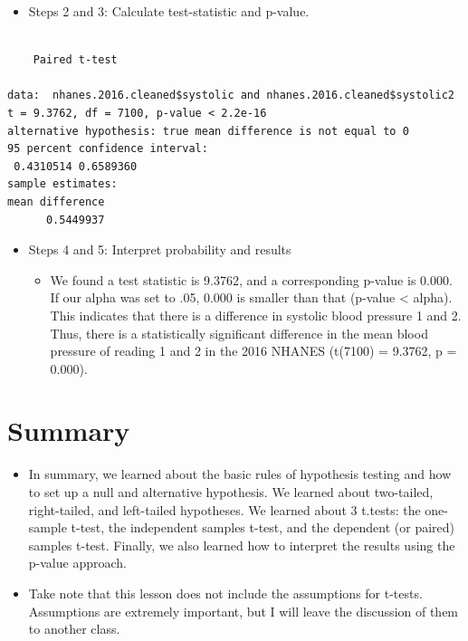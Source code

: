 \documentclass[
  letterpaper,
  DIV=11,
  numbers=noendperiod]{scrreprt}
\newenvironment{Shaded}{\begin{snugshade}}{\end{snugshade}}
\newcommand{\AttributeTok}[1]{\textcolor[rgb]{0.40,0.45,0.13}{#1}}
\newcommand{\ConstantTok}[1]{\textcolor[rgb]{0.56,0.35,0.01}{#1}}
\newcommand{\FloatTok}[1]{\textcolor[rgb]{0.68,0.00,0.00}{#1}}
\newcommand{\FunctionTok}[1]{\textcolor[rgb]{0.28,0.35,0.67}{#1}}
\newcommand{\NormalTok}[1]{\textcolor[rgb]{0.00,0.23,0.31}{#1}}
\newcommand{\SpecialCharTok}[1]{\textcolor[rgb]{0.37,0.37,0.37}{#1}}
\providecommand{\tightlist}{%
  \setlength{\itemsep}{0pt}\setlength{\parskip}{0pt}}\usepackage{longtable,booktabs,array}
\begin{document}
\begin{itemize}
\tightlist
\item
  Steps 2 and 3: Calculate test-statistic and p-value.
\end{itemize}

\begin{Shaded}
\end{Shaded}

\begin{verbatim}

    Paired t-test

data:  nhanes.2016.cleaned$systolic and nhanes.2016.cleaned$systolic2
t = 9.3762, df = 7100, p-value < 2.2e-16
alternative hypothesis: true mean difference is not equal to 0
95 percent confidence interval:
 0.4310514 0.6589360
sample estimates:
mean difference 
      0.5449937 
\end{verbatim}

\begin{itemize}
\tightlist
\item
  Steps 4 and 5: Interpret probability and results

  \begin{itemize}
  \tightlist
  \item
    We found a test statistic is 9.3762, and a corresponding p-value is
    0.000. If our alpha was set to .05, 0.000 is smaller than that
    (p-value \textless{} alpha). This indicates that there is a
    difference in systolic blood pressure 1 and 2. Thus, there is a
    statistically significant difference in the mean blood pressure of
    reading 1 and 2 in the 2016 NHANES (t(7100) = 9.3762, p = 0.000).
  \end{itemize}
\end{itemize}


\chapter{Summary}\label{summary-7}

\begin{itemize}
\tightlist
\item
  In summary, we learned about the basic rules of hypothesis testing and
  how to set up a null and alternative hypothesis. We learned about
  two-tailed, right-tailed, and left-tailed hypotheses. We learned about
  3 t.tests: the one-sample t-test, the independent samples t-test, and
  the dependent (or paired) samples t-test. Finally, we also learned how
  to interpret the results using the p-value approach.
\item
  Take note that this lesson does not include the assumptions for
  t-tests. Assumptions are extremely important, but I will leave the
  discussion of them to another class.
\end{itemize}
\end{document}
